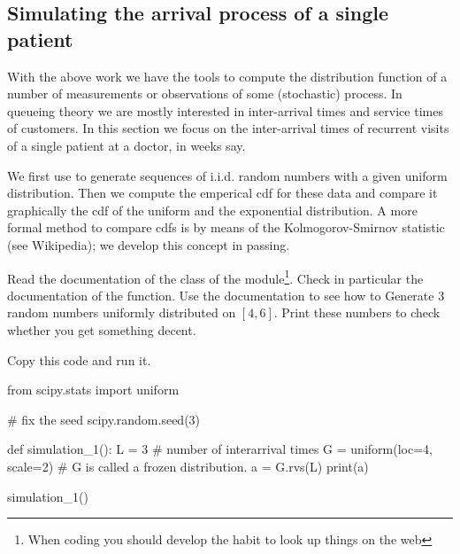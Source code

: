 \subsection{Simulating the arrival process of a single patient}
\label{sec:simulations}

With the above work we have the tools to compute the distribution function of a number of measurements or observations of some (stochastic) process.
In queueing theory we are mostly interested in inter-arrival times and service times of customers.
In this section we focus on the inter-arrival times of recurrent visits of a single patient at a doctor, in weeks say.

We first use  to generate sequences of i.i.d.
random numbers with a given uniform distribution.
Then we compute the emperical cdf for these data and compare it graphically the cdf of the uniform and the exponential distribution.
A more formal method to compare cdfs is by means of the Kolmogorov-Smirnov statistic (see Wikipedia);  we develop this concept in passing.

\begin{exercise}
  Read the documentation of the  class of the  module\footnote{When coding you should develop the habit to look up things on the web}.
  Check in particular the documentation of the  function.
  Use the documentation to see how to Generate 3 random numbers uniformly distributed on $[4,6]$.
  Print these numbers to check whether you get something decent.

\begin{solution}
Copy this code and run it.
\begin{pyverbatim}
from scipy.stats import uniform

# fix the seed
scipy.random.seed(3)

def simulation_1():
    L = 3  # number of interarrival times
    G = uniform(loc=4, scale=2)  # G is called a frozen distribution.
    a = G.rvs(L)
    print(a)

simulation_1()
\end{pyverbatim}

\end{solution}

\end{exercise}


